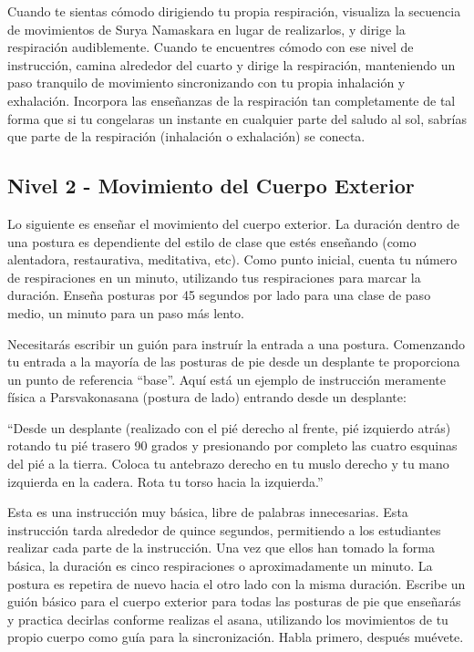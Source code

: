 Cuando te sientas cómodo dirigiendo tu propia respiración, visualiza  la secuencia de movimientos de Surya Namaskara en lugar de realizarlos, y dirige la respiración audiblemente. Cuando te encuentres cómodo con ese nivel de instrucción, camina alrededor del cuarto y dirige la respiración, manteniendo un paso tranquilo de movimiento sincronizando con tu propia inhalación y exhalación. Incorpora las enseñanzas de la respiración tan completamente de tal forma que si tu congelaras un instante en cualquier parte del saludo al sol, sabrías que parte de la respiración (inhalación o exhalación) se conecta.

\subsection{Nivel 2 - Movimiento del Cuerpo Exterior}
Lo siguiente es enseñar el movimiento del cuerpo exterior. La duración dentro de una postura es dependiente del estilo de clase que est\'es enseñando (como alentadora, restaurativa, meditativa, etc). Como punto inicial, cuenta tu número de respiraciones en un minuto, utilizando tus respiraciones para marcar la duración. Enseña posturas por 45 segundos por lado para una clase de paso medio, un minuto para un paso más lento.

Necesitarás escribir un guión para instruír la entrada a una postura. Comenzando tu entrada a la mayoría de las posturas de pie desde un desplante te proporciona un punto de referencia ``base''. Aquí está un ejemplo de instrucción meramente física a Parsvakonasana (postura de lado) entrando desde un desplante:

``Desde un desplante (realizado con el pi\'e derecho al frente, pi\'e izquierdo atrás) rotando tu pi\'e trasero 90 grados y presionando por completo las cuatro esquinas del pi\'e a la tierra. Coloca tu antebrazo derecho en tu muslo derecho y tu mano izquierda en la cadera. Rota tu torso hacia la izquierda.''

Esta es una instrucción muy básica, libre de palabras innecesarias. Esta instrucción tarda alrededor de quince segundos, permitiendo a los estudiantes realizar cada parte de la instrucción. Una vez que ellos han tomado la forma básica, la duración es cinco respiraciones o aproximadamente un minuto. La postura es repetira de nuevo hacia el otro lado con la misma duración. Escribe un guión básico para el cuerpo exterior para todas las posturas de pie que enseñarás y practica decirlas conforme realizas el asana, utilizando los movimientos de tu propio cuerpo como guía para la sincronización. Habla primero, despu\'es mu\'evete.

